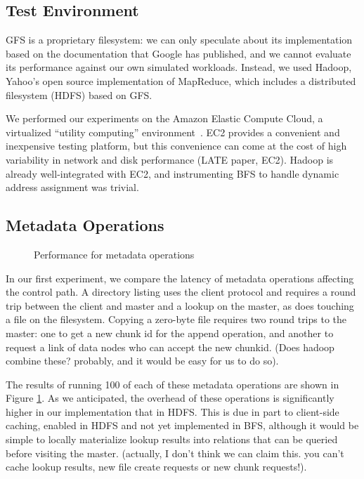 \documentclass{article}
\begin{document}
\subsection{Test Environment}
GFS is a proprietary filesystem: we can only speculate about its
implementation based on the documentation that Google has published,
and we cannot evaluate its performance against our own simulated
workloads.  Instead, we used Hadoop, Yahoo's open source
implementation of MapReduce, which includes a distributed filesystem
(HDFS) based on GFS.

We performed our experiments on the Amazon Elastic Compute Cloud, a
virtualized ``utility computing'' environment~\cite{amazon-ec2}.  EC2
provides a convenient and inexpensive testing platform, but this
convenience can come at the cost of high variability in network and
disk performance (LATE paper, EC2).  Hadoop is already well-integrated
with EC2, and instrumenting BFS to handle dynamic address assignment
was trivial.

\subsection{Metadata Operations}
\begin{figure}
\centering
{}
\caption{Performance for metadata operations}
\label{fig:metadata-perf}
\end{figure}

In our first experiment, we compare the latency of metadata operations
affecting the control path.  A directory listing uses the client
protocol and requires a round trip between the client and master and a
lookup on the master, as does touching a file on the filesystem.
Copying a zero-byte file requires two round trips to the master: one
to get a new chunk id for the append operation, and another to request
a link of data nodes who can accept the new chunkid.  (Does hadoop
combine these?  probably, and it would be easy for us to do so).

The results of running 100 of each of these metadata operations are
shown in Figure \ref{fig:metadata-perf}.  As we anticipated, the
overhead of these operations is significantly higher in our
implementation that in HDFS.  This is due in part to client-side
caching, enabled in HDFS and not yet implemented in BFS, although it
would be simple to locally materialize lookup results into relations
that can be queried before visiting the master. (actually, I don't
think we can claim this.  you can't cache lookup results, new file
create requests or new chunk requests!).
\end{document}
